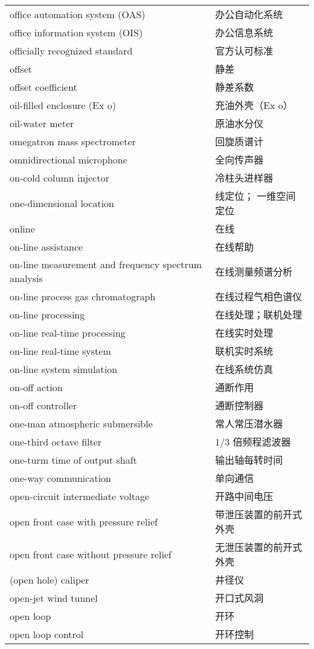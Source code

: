 \documentclass[
]{article}
\begin{document}
\begin{longtable}[]{@{}ll@{}}
office automation system (OAS) & 办公自动化系统 \\
office information system (OIS) & 办公信息系统 \\
officially recognized standard & 官方认可标准 \\
offset & 静差 \\
offset coefficient & 静差系数 \\
oil-filled enclosure (Ex o) & 充油外壳（Ex o） \\
oil-water meter & 原油水分仪 \\
omegatron mass spectrometer & 回旋质谱计 \\
omnidirectional microphone & 全向传声器 \\
on-cold column injector & 冷柱头进样器 \\
one-dimensional location & 线定位； 一维空间定位 \\
online & 在线 \\
on-line assistance & 在线帮助 \\
on-line measurement and frequency spectrum analysis &
在线测量频谱分析 \\
on-line process gas chromatograph & 在线过程气相色谱仪 \\
on-line processing & 在线处理；联机处理 \\
on-line real-time processing & 在线实时处理 \\
on-line real-time system & 联机实时系统 \\
on-line system simulation & 在线系统仿真 \\
on-off action & 通断作用 \\
on-off controller & 通断控制器 \\
one-man atmospheric submersible & 常人常压潜水器 \\
one-third octave filter & 1/3 倍频程滤波器 \\
one-turm time of output shaft & 输出轴每转时间 \\
one-way communication & 单向通信 \\
open-circuit intermediate voltage & 开路中间电压 \\
open front case with pressure relief & 带泄压装置的前开式外壳 \\
open front case without pressure relief & 无泄压装置的前开式外壳 \\
(open hole) caliper & 井径仪 \\
open-jet wind tunnel & 开口式风洞 \\
open loop & 开环 \\
open loop control & 开环控制 \\

\end{longtable}
\end{document}
